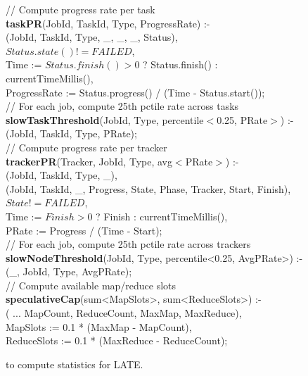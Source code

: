 \begin{figure}[p]
\ssp
\begin{boxedminipage}{\linewidth}

// Compute progress rate per task \\
 {\bf taskPR}(JobId, TaskId, Type, ProgressRate) :- \\
(JobId, TaskId, Type, \_, \_, \_, Status), \\
\datalogspace $Status.state() != FAILED$,  \\
\datalogspace Time := $Status.finish() > 0$ ? Status.finish() : currentTimeMillis(), \\
\datalogspace ProgressRate := Status.progress() / (Time - Status.start()); \\

// For each job, compute 25th pctile rate across tasks \\
 {\bf slowTaskThreshold}(JobId, Type, percentile$<$0.25, PRate$>$) :- \\
(JobId, TaskId, Type, PRate); \\

// Compute progress rate per tracker \\
 {\bf trackerPR}(Tracker, JobId, Type, avg$<$PRate$>$) :- \\ 
(JobId, TaskId, Type, \_), \\
(JobId, TaskId, \_, Progress, State, Phase, Tracker, Start, Finish), \\
\datalogspace $State != FAILED$, \\
\datalogspace Time := $Finish > 0$ ? Finish : currentTimeMillis(), \\ 
\datalogspace PRate := Progress / (Time - Start);  \\

// For each job, compute 25th pctile rate across trackers \\
 {\bf slowNodeThreshold}(JobId, Type, percentile<0.25, AvgPRate>) :- \\
(\_, JobId, Type, AvgPRate); \\

// Compute available map/reduce slots \\
 {\bf speculativeCap}(sum<MapSlots>, sum<ReduceSlots>) :- \\
( ... MapCount, ReduceCount, MaxMap, MaxReduce), \\
\datalogspace MapSlots := 0.1 * (MaxMap - MapCount), \\
\datalogspace ReduceSlots := 0.1 * (MaxReduce - ReduceCount); \\
\end{boxedminipage}
\caption{\OVERLOG to compute statistics for LATE.}
\label{fig:latePolicy}
\end{figure}

